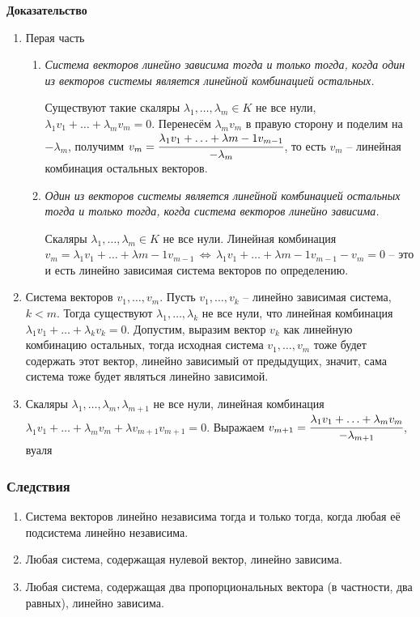 \documentclass{article}
\begin{document}
\textbf{Доказательство}
\begin{enumerate}
    \item Перая часть
    \begin{enumerate}
        \item \textit{Система векторов линейно зависима тогда и только тогда, когда один из векторов системы является линейной комбинацией остальных.}
        
        Существуют такие скаляры $\lambda_1,\ldots,\lambda_m\in K$ не все нули, $\lambda_1v_1+\ldots+\lambda_m v_m=0$. Перенесём $\lambda_m v_m$ в правую сторону и поделим на $-\lambda_m$, получимм $v_m=\cfrac{\lambda_1v_1+\ldots+\lambda{m-1} v_{m-1}}{-\lambda_m}$, то есть $v_m$ -- линейная комбинация остальных векторов.
        \item \textit{Один из векторов системы является линейной комбинацией остальных тогда и только тогда, когда система векторов линейно зависима.}
        
        Скаляры $\lambda_1,\ldots,\lambda_m\in K$ не все нули. Линейная комбинация $v_m=\lambda_1v_1+\ldots+\lambda{m-1} v_{m-1}\,\Leftrightarrow\,\lambda_1v_1+\ldots+\lambda{m-1} v_{m-1}-v_m=0$ -- это и есть линейно зависимая система векторов по определению.
    \end{enumerate}
    \item Система векторов $v_1,\ldots, v_m$. Пусть $v_1,\ldots,v_k$ -- линейно зависимая система, $k<m$. Тогда существуют $\lambda_1,\ldots,\lambda_k$ не все нули, что линейная комбинация $\lambda_1v_1+\ldots+\lambda_k v_k=0$. Допустим, выразим вектор $v_k$ как линейную комбинацию остальных, тогда исходная система $v_1,\ldots,v_m$ тоже будет содержать этот вектор, линейно зависимый от предыдущих, значит, сама система тоже будет являться линейно зависимой.
    \item Скаляры $\lambda_1,\ldots,\lambda_m,\lambda_{m+1}$ не все нули, линейная комбинация $\lambda_1v_1+\ldots+\lambda_m v_m+\lambda v_{m+1}v_{m+1}=0$. Выражаем $v_{m+1}=\cfrac{\lambda_1v_1+\ldots+\lambda_m v_m}{-\lambda_{m+1}}$, вуаля
\end{enumerate}
\subsubsection{Следствия}
\begin{enumerate}
    \item Система векторов линейно независима тогда и только тогда, когда любая её подсистема линейно независима.
    \item Любая система, содержащая нулевой вектор, линейно зависима.
    \item Любая система, содержащая два пропорциональных вектора (в частности, два равных), линейно зависима.
\end{enumerate}
\end{document}
